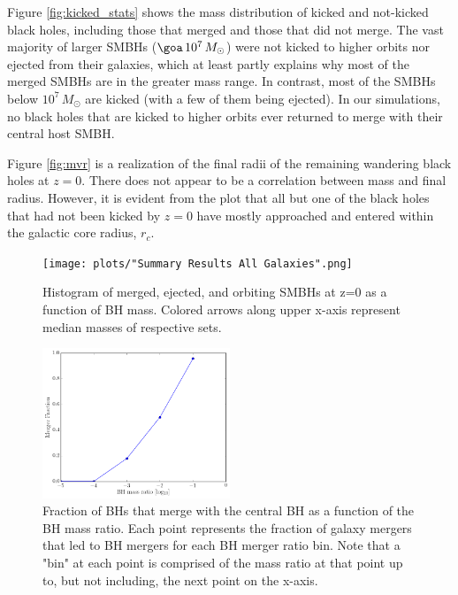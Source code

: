 \documentclass[fleqn,usenatbib,useAMS]{mnras}
\begin{document}
Figure \ref{fig:kicked_stats} shows the mass distribution of kicked and not-kicked black holes, including those that merged and those that did not merge.  The vast majority of larger SMBHs ($\goa\, 10^7\, M_{\odot}$) were not kicked to higher orbits nor ejected from their galaxies, which at least partly explains why most of the merged SMBHs are in the greater mass range.  In contrast, most of the SMBHs below $10^7\, M_{\odot}$ are kicked (with a few of them being ejected).  In our simulations, no black holes that are kicked to higher orbits ever returned to merge with their central host SMBH.

Figure \ref{fig:mvr} is a realization of the final radii of the remaining wandering black holes at $z=0$.  There does not appear to be a correlation between mass and final radius.  However, it is evident from the plot that all but one of the black holes that had not been kicked by $z=0$ have mostly approached and entered within the galactic core radius, $r_c$.

\begin{figure}
\begin{center}
\texttt{[image: plots/"Summary Results All Galaxies".png]}
\caption{Histogram of merged, ejected, and orbiting SMBHs at z=0 as a function of BH mass.  Colored arrows along upper x-axis represent median masses of respective sets.}
\label{fig:meosmbh}
\end{center}
\end{figure}

\begin{figure}
\begin{center}
\includegraphics[width=0.5\textwidth]{plots/q_merger_fraction.png}
\caption{Fraction of BHs that merge with the central BH as a function of the BH mass ratio.  Each point represents the fraction of galaxy mergers that led to BH mergers for each BH merger ratio bin.  Note that a "bin" at each point is comprised of the mass ratio at that point up to, but not including, the next point on the x-axis.}
\label{fig:q_merge_fraction}
\end{center}
\end{figure}
\end{document}

